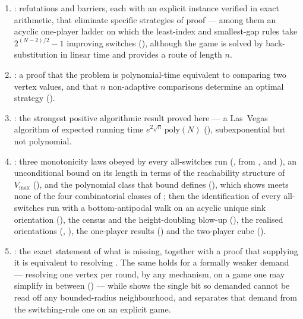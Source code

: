 \documentclass[11pt]{article}
\theoremstyle{plain}
\theoremstyle{definition}
\newcommand{\Vmax}{V_{\max}}
\begin{document}
\begin{enumerate}[label=(\roman*),leftmargin=2.2em]
  improving path of length at most $n$. Explicit instances
  () show that the stopping
  hypothesis is not removable.
\item {}: refutations and barriers, each with an
  explicit instance verified in exact arithmetic, that eliminate specific
  strategies of proof --- among them an acyclic one-player ladder on
  which the least-index and smallest-gap rules take $2^{(N-2)/2}-1$
  improving switches (), although the game is solved by
  back-substitution in linear time and  provides a
  route of length $n$.
\item {}: a proof that the problem is polynomial-time
  equivalent to comparing two vertex values, and that $n$ non-adaptive
  comparisons determine an optimal strategy
  ().
\item {}: the strongest positive algorithmic result
  proved here --- a Las~Vegas algorithm of expected running time
  $e^{2\sqrt n}\,\mathrm{poly}(N)$ (), subexponential but
  not polynomial.
\item {}: three monotonicity laws obeyed by every
  all-switches run (, from
  ,  and
  ), an unconditional bound on its length in terms of
  the reachability structure of $\Vmax$ (), and
  the polynomial class that bound defines (),
  which  shows meets none of the four combinatorial
  classes of ; then the identification of every
  all-switches run with a bottom-antipodal walk on an acyclic unique sink
  orientation (),
  the census and the height-doubling blow-up
  (), the realised
  orientations (, ), the
  one-player results ()
  and the two-player cube ().
\item {}: the exact statement of what is missing, together
  with a proof that supplying it is equivalent to resolving
  . The same holds for a formally weaker demand ---
  resolving one vertex per round, by any mechanism, on a game one may
  simplify in between () --- while
   shows the single bit so demanded cannot be read
  off any bounded-radius neighbourhood, and 
  separates that demand from the switching-rule one on an explicit
  game.
\end{enumerate}
\end{document}
